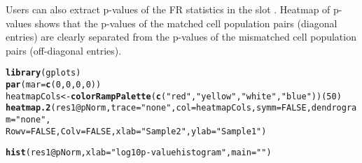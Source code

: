 \documentclass[12pt]{article}\usepackage[]{graphicx}\usepackage[usenames,dvipsnames]{color}
\makeatletter
\newcommand{\hlnum}[1]{\textcolor[rgb]{0.686,0.059,0.569}{#1}}%
\newcommand{\hlstr}[1]{\textcolor[rgb]{0.192,0.494,0.8}{#1}}%
\newcommand{\hlopt}[1]{\textcolor[rgb]{0,0,0}{#1}}%
\newcommand{\hlstd}[1]{\textcolor[rgb]{0.345,0.345,0.345}{#1}}%
\newcommand{\hlkwb}[1]{\textcolor[rgb]{0.69,0.353,0.396}{#1}}%
\newcommand{\hlkwc}[1]{\textcolor[rgb]{0.333,0.667,0.333}{#1}}%
\newcommand{\hlkwd}[1]{\textcolor[rgb]{0.737,0.353,0.396}{\textbf{#1}}}%
\newenvironment{kframe}{%
 \def\at@end@of@kframe{}%
 \ifinner\ifhmode%
  \def\at@end@of@kframe{\end{minipage}}%
  \begin{minipage}{\columnwidth}%
 \fi\fi%
 \def\FrameCommand##1{\hskip\@totalleftmargin \hskip-\fboxsep
 \colorbox{shadecolor}{##1}\hskip-\fboxsep
     \hskip-\linewidth \hskip-\@totalleftmargin \hskip\columnwidth}%
 \MakeFramed {\advance\hsize-\width
   \@totalleftmargin\z@ \linewidth\hsize
   \@setminipage}}%
 {\par\unskip\endMakeFramed%
 \at@end@of@kframe}
\newenvironment{knitrout}{}{} %
\makeatother
\begin{document}
Users can also extract p-values of the FR statistics in the slot . Heatmap of p-values shows that the p-values of the matched cell population pairs (diagonal entries) are clearly separated from the p-values of the mismatched cell population pairs (off-diagonal entries). 

\begin{knitrout}
\color{fgcolor}\begin{kframe}
\begin{alltt}
\hlkwd{library}\hlstd{(gplots)}
\hlkwd{par}\hlstd{(}\hlkwc{mar}\hlstd{=}\hlkwd{c}\hlstd{(}\hlnum{0}\hlstd{,}\hlnum{0}\hlstd{,}\hlnum{0}\hlstd{,}\hlnum{0}\hlstd{))}
\hlstd{heatmapCols} \hlkwb{<-} \hlkwd{colorRampPalette}\hlstd{(}\hlkwd{c}\hlstd{(}\hlstr{"red"}\hlstd{,}\hlstr{"yellow"}\hlstd{,}\hlstr{"white"}\hlstd{,}\hlstr{"blue"}\hlstd{))(}\hlnum{50}\hlstd{)}
\hlkwd{heatmap.2}\hlstd{(res1}\hlopt{@}\hlkwc{pNorm}\hlstd{,}\hlkwc{trace}\hlstd{=}\hlstr{"none"}\hlstd{,}\hlkwc{col}\hlstd{=heatmapCols,}\hlkwc{symm}\hlstd{=}\hlnum{FALSE}\hlstd{,}\hlkwc{dendrogram}\hlstd{=}\hlstr{"none"}\hlstd{,}
          \hlkwc{Rowv}\hlstd{=}\hlnum{FALSE}\hlstd{,}\hlkwc{Colv}\hlstd{=}\hlnum{FALSE}\hlstd{,}\hlkwc{xlab}\hlstd{=}\hlstr{"Sample 2"}\hlstd{,}\hlkwc{ylab}\hlstd{=}\hlstr{"Sample 1"}\hlstd{)}
\end{alltt}
\end{kframe}
\end{knitrout}


\begin{knitrout}
\color{fgcolor}\begin{kframe}
\begin{alltt}
\hlkwd{hist}\hlstd{(res1}\hlopt{@}\hlkwc{pNorm}\hlstd{,}\hlkwc{xlab}\hlstd{=}\hlstr{"log10 p-value histogram"}\hlstd{,}\hlkwc{main}\hlstd{=}\hlstr{""}\hlstd{)}
\end{alltt}
\end{kframe}
\end{knitrout}

\end{document}
